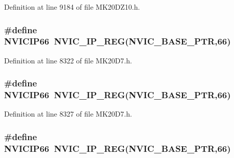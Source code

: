 Definition at line 9184 of file M\+K20\+D\+Z10.\+h.

\subsubsection[{\texorpdfstring{N\+V\+I\+C\+I\+P66}{NVICIP66}}]{\setlength{\rightskip}{0pt plus 5cm}\#define N\+V\+I\+C\+I\+P66~{\bf N\+V\+I\+C\+\_\+\+I\+P\+\_\+\+R\+EG}({\bf N\+V\+I\+C\+\_\+\+B\+A\+S\+E\+\_\+\+P\+TR},66)}\hypertarget{group___n_v_i_c___register___accessor___macros_ga907f1943ed90dba997524f80628295a1}{}\label{group___n_v_i_c___register___accessor___macros_ga907f1943ed90dba997524f80628295a1}


Definition at line 8322 of file M\+K20\+D7.\+h.

\subsubsection[{\texorpdfstring{N\+V\+I\+C\+I\+P66}{NVICIP66}}]{\setlength{\rightskip}{0pt plus 5cm}\#define N\+V\+I\+C\+I\+P66~{\bf N\+V\+I\+C\+\_\+\+I\+P\+\_\+\+R\+EG}({\bf N\+V\+I\+C\+\_\+\+B\+A\+S\+E\+\_\+\+P\+TR},66)}\hypertarget{group___n_v_i_c___register___accessor___macros_ga907f1943ed90dba997524f80628295a1}{}\label{group___n_v_i_c___register___accessor___macros_ga907f1943ed90dba997524f80628295a1}


Definition at line 8327 of file M\+K20\+D7.\+h.

\subsubsection[{\texorpdfstring{N\+V\+I\+C\+I\+P66}{NVICIP66}}]{\setlength{\rightskip}{0pt plus 5cm}\#define N\+V\+I\+C\+I\+P66~{\bf N\+V\+I\+C\+\_\+\+I\+P\+\_\+\+R\+EG}({\bf N\+V\+I\+C\+\_\+\+B\+A\+S\+E\+\_\+\+P\+TR},66)}\hypertarget{group___n_v_i_c___register___accessor___macros_ga907f1943ed90dba997524f80628295a1}{}\label{group___n_v_i_c___register___accessor___macros_ga907f1943ed90dba997524f80628295a1}


